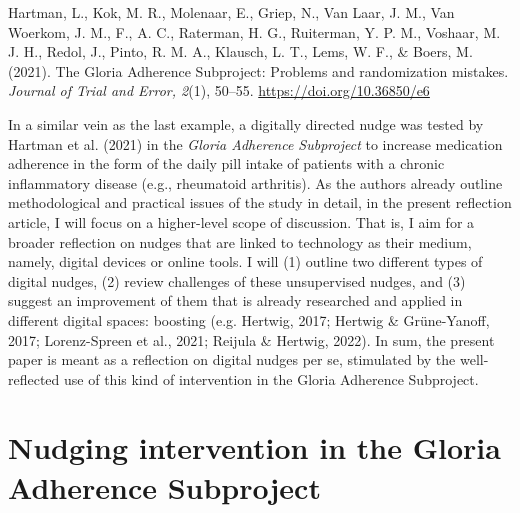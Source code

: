 \documentclass[reflection, authordate]{jote-new-article}
\begin{document}


\begin{companion}
Hartman, L., Kok, M. R., Molenaar, E., Griep, N., Van Laar, J. M., Van Woerkom, J. M., F., A. C., Raterman, H. G., Ruiterman, Y. P. M., Voshaar, M. J. H., Redol, J., Pinto, R. M. A., Klausch, L. T., Lems, W. F., \& Boers, M. (2021). The Gloria Adherence Subproject: Problems and randomization mistakes. \emph{Journal of Trial and Error, 2}(1), 50–55. \url{https://doi.org/10.36850/e6}
\end{companion}

In a similar vein as the last example, a digitally directed nudge was tested by Hartman et al. (2021) in the \emph{Gloria Adherence Subproject} to increase medication adherence in the form of the daily pill intake of patients with a chronic inflammatory disease (e.g., rheumatoid arthritis). As the authors already outline methodological and practical issues of the study in detail, in the present reflection article, I will focus on a higher-level scope of discussion. That is, I aim for a broader reflection on nudges that are linked to technology as their medium, namely, digital devices or online tools. I will (1) outline two different types of digital nudges, (2) review challenges of these unsupervised nudges, and (3) suggest an improvement of them that is already researched and applied in different digital spaces: boosting  (e.g. Hertwig, 2017; Hertwig \& Grüne-Yanoff, 2017; Lorenz-Spreen et al., 2021; Reijula \& Hertwig, 2022). In sum, the present paper is meant as a reflection on digital nudges per se, stimulated by the well-reflected use of this kind of intervention in the Gloria Adherence Subproject.



\section{Nudging intervention in the Gloria Adherence Subproject}
\end{document}

